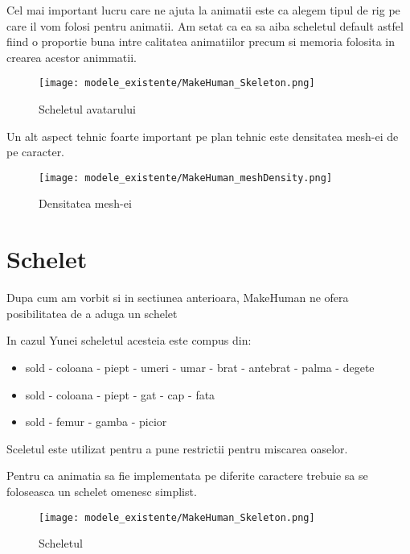 \documentclass[12pt,a4paper]{report}
\begin{document}
Cel mai important lucru care ne ajuta la animatii este ca alegem tipul de rig pe care il vom folosi pentru animatii. Am setat ca ea sa aiba scheletul default astfel fiind o proportie buna intre calitatea animatiilor precum si memoria folosita in crearea acestor animmatii.

\begin{figure}[th]
\centering
\texttt{[image: modele\_existente/MakeHuman\_Skeleton.png]}
  \caption[Scheletul avatarului]{Scheletul avatarului\protect\footnotemark}
  \label{figure_1:picture_12}
\end{figure}

Un alt aspect tehnic foarte important pe plan tehnic este densitatea mesh-ei de pe caracter.


\begin{figure}[th]
\centering
\texttt{[image: modele\_existente/MakeHuman\_meshDensity.png]}
  \caption[Densitatea mesh-ei]{Densitatea mesh-ei\protect\footnotemark}
  \label{figure_1:picture_12}
\end{figure}


\todo[inline, color=blue!40]{}


\section{Schelet}
Dupa cum am vorbit si in sectiunea anterioara, MakeHuman ne ofera posibilitatea de a aduga un schelet 

In cazul Yunei scheletul acesteia este compus din:
\begin{itemize}
    \item sold - coloana - piept - umeri - umar - brat - antebrat - palma - degete
    \item sold - coloana - piept - gat - cap - fata
    \item sold - femur - gamba - picior
\end{itemize}

Sceletul este utilizat pentru a pune restrictii pentru miscarea oaselor.

Pentru ca animatia sa fie implementata pe diferite caractere trebuie sa se foloseasca un schelet omenesc simplist. 


\begin{figure}[th]
\centering
\texttt{[image: modele\_existente/MakeHuman\_Skeleton.png]}
  \caption[Scheletul]{Scheletul\protect\footnotemark}
  \label{figure_1:picture_10}
\end{figure}
\end{document}
